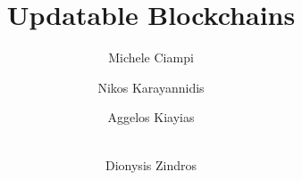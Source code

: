 \title{Updatable Blockchains}
\author{}

\institute{}


\author{Michele Ciampi 
	\and   Nikos Karayannidis
	\and Aggelos Kiayias 
        \and \\ Dionysis Zindros 
       }


\maketitle



